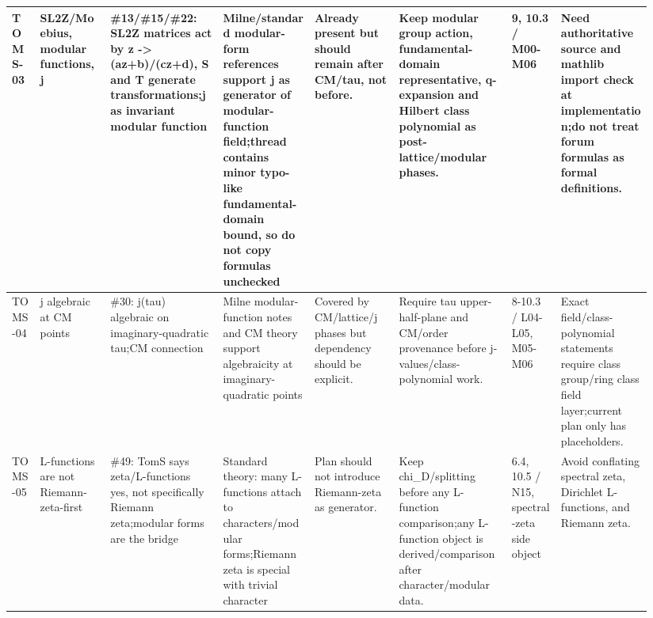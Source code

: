 \begin{longtable}{L{0.04\linewidth} L{0.105\linewidth} L{0.16\linewidth} L{0.13\linewidth} L{0.125\linewidth} L{0.165\linewidth} L{0.075\linewidth} L{0.135\linewidth}}
\hline
\addlinespace[0.24em]
TOMS-03 & SL2Z/\allowbreak{}Moebius, modular functions, j & \#13/\allowbreak{}\#15/\allowbreak{}\#22: SL2Z matrices act by z -> (az+b)/\allowbreak{}(cz+d), S and T generate transformations;\newline j as invariant modular function & Milne/\allowbreak{}standard modular-form references support j as generator of modular-function field;\newline thread contains minor typo-like fundamental-domain bound, so do not copy formulas unchecked & Already present but should remain after CM/\allowbreak{}tau, not before. & Keep modular group action, fundamental-domain representative, q-expansion and Hilbert class polynomial as post-lattice/\allowbreak{}modular phases. & 9, 10.3 /\allowbreak{} M00-M06 & Need authoritative source and mathlib import check at implementation;\newline do not treat forum formulas as formal definitions.\\
\hline
\addlinespace[0.24em]
TOMS-04 & j algebraic at CM points & \#30: j(tau) algebraic on imaginary-quadratic tau;\newline CM connection & Milne modular-function notes and CM theory support algebraicity at imaginary-quadratic points & Covered by CM/\allowbreak{}lattice/\allowbreak{}j phases but dependency should be explicit. & Require tau upper-half-plane and CM/\allowbreak{}order provenance before j-values/\allowbreak{}class-polynomial work. & 8-10.3 /\allowbreak{} L04-L05, M05-M06 & Exact field/\allowbreak{}class-polynomial statements require class group/\allowbreak{}ring class field layer;\newline current plan only has placeholders.\\
\hline
\addlinespace[0.24em]
TOMS-05 & L-functions are not Riemann-zeta-first & \#49: TomS says zeta/\allowbreak{}L-functions yes, not specifically Riemann zeta;\newline modular forms are the bridge & Standard theory: many L-functions attach to characters/\allowbreak{}modular forms;\newline Riemann zeta is special with trivial character & Plan should not introduce Riemann-zeta as generator. & Keep chi\_D/\allowbreak{}splitting before any L-function comparison;\newline any L-function object is derived/\allowbreak{}comparison after character/\allowbreak{}modular data. & 6.4, 10.5 /\allowbreak{} N15, spectral-zeta side object & Avoid conflating spectral zeta, Dirichlet L-functions, and Riemann zeta.\\

\end{longtable}
